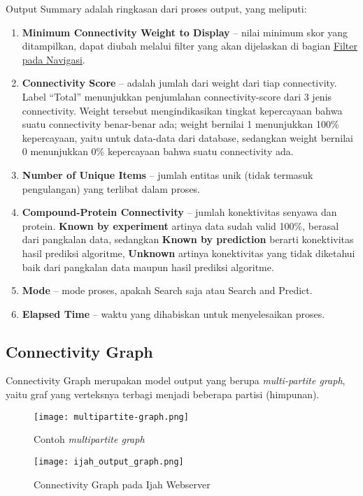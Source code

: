 	Output Summary adalah ringkasan dari proses output, yang meliputi:
	\begin{enumerate}
	\item \textbf{Minimum Connectivity Weight to Display}
	-- nilai minimum skor yang ditampilkan,
	dapat diubah melalui filter yang akan dijelaskan di bagian \hyperref[nav]{Filter pada Navigasi}.
	\item \textbf{Connectivity Score}
	-- adalah jumlah dari weight dari tiap connectivity.
	Label ``Total'' menunjukkan penjumlahan connectivity-score dari 3 jenis connectivity.
	Weight tersebut mengindikasikan tingkat kepercayaan bahwa suatu connectivity benar-benar ada;
	weight bernilai 1 menunjukkan 100\% kepercayaan, yaitu untuk data-data dari database,
	sedangkan weight bernilai 0 menunjukkan 0\% kepercayaan bahwa suatu connectivity ada.
	\item \textbf{Number of Unique Items}
	-- jumlah entitas unik (tidak termasuk pengulangan) yang terlibat dalam proses.
	\item \textbf{Compound-Protein Connectivity}
	-- jumlah konektivitas senyawa dan protein. \textbf{Known by experiment} artinya data sudah valid 100\%, berasal dari pangkalan data, sedangkan \textbf{Known by prediction} berarti konektivitas hasil prediksi algoritme, \textbf{Unknown} artinya konektivitas yang tidak diketahui baik dari pangkalan data maupun hasil prediksi algoritme.
	\item \textbf{Mode}
	-- mode proses, apakah Search saja atau Search and Predict.
	\item \textbf{Elapsed Time}
	-- waktu yang dihabiskan untuk menyelesaikan proses.
	\end{enumerate}

	\subsection{Connectivity Graph} \label{graph}
	Connectivity Graph merupakan model output yang berupa \emph{multi-partite graph}, yaitu graf yang verteksnya terbagi menjadi beberapa partisi (himpunan).

	\begin{figure}[H]
	\centering
	\texttt{[image: multipartite-graph.png]}
	\caption{Contoh \emph{multipartite graph}}
	\label{fig:multipartite-graph}
	\end{figure}

	\begin{figure}[H]
	\centering
	\texttt{[image: ijah\_output\_graph.png]}
	\caption{Connectivity Graph pada Ijah Webserver}
	\label{fig:ijah_output_graph}
	\end{figure}

